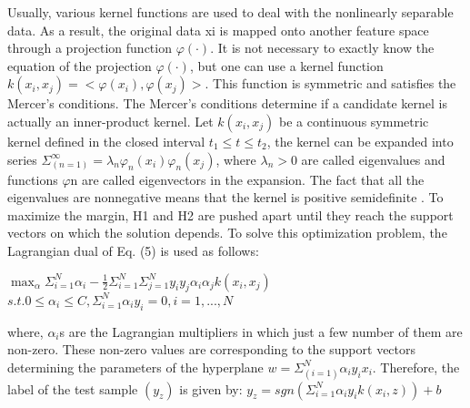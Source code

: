 Usually, various kernel functions are used to deal with the nonlinearly separable data. 
As a result, the original data xi is mapped onto another feature space through a 
projection function ${\varphi(\cdot)}$. It is not necessary to exactly know the equation of the 
projection ${\varphi(\cdot)}$, but one can use a kernel function ${k(x_i,x_j)=<\varphi(x_i),\varphi(x_j)>}$. 
This function is symmetric and satisfies the Mercer’s conditions. The Mercer’s conditions determine 
if a candidate kernel is actually an inner-product kernel. Let ${k(x_i,x_j)}$ be a continuous 
symmetric kernel defined in the closed interval ${t_1\leq t\leq t_2}$, the kernel can be expanded 
into series ${\Sigma_(n=1)^\infty = \lambda_n\varphi_n(x_i)\varphi_n(x_j)}$, where 
${\lambda_n > 0}$ are called eigenvalues and functions $\varphi$n are called eigenvectors in the expansion. 
The fact that all the eigenvalues are nonnegative means that the kernel is positive 
semidefinite \cite{SupportVector1995}. 
To maximize the margin, H1 and H2 are pushed apart until they reach the support vectors 
on which the solution depends. To solve this optimization problem, the Lagrangian dual 
of Eq. (5) is used as follows:

$\max_\alpha \Sigma_{i=1}^{N} \alpha_i - \frac{1}{2} \Sigma_{i=1}^{N} \Sigma_{j=1}^{N} y_i y_j \alpha_i \alpha_j k(x_i, x_j)$\newline
$s.t. 0 \le \alpha_i \le C, \Sigma_{i=1}^{N} \alpha_i y_i = 0, i = 1, ..., N$\newline

where, ${\alpha_i}$s are the Lagrangian multipliers in which just a few number of them are 
non-zero. These non-zero values are corresponding to the support vectors determining 
the parameters of the hyperplane ${w = \Sigma_(i=1)^N\alpha_iy_ix_i }$. Therefore, the label 
of the test sample ${(y_z)}$ is given by:
$y_z = sgn(\Sigma_{i=1}^{N} \alpha_i y_i k(x_i, z)) + b$\newline

%
%
